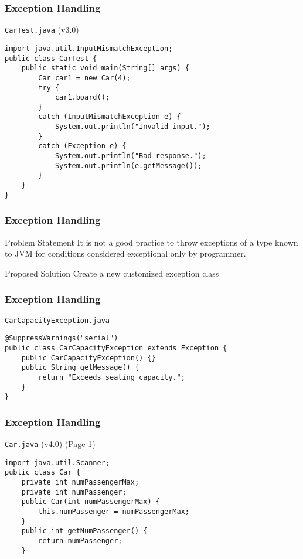 \documentclass[10pt, compress]{beamer}
\begin{document}
\begin{frame}[fragile]
	\frametitle{Exception Handling}
	\begin{block}{\texttt{CarTest.java} (v3.0)}
		\begin{verbatim}
import java.util.InputMismatchException;
public class CarTest {
	public static void main(String[] args) {
		Car car1 = new Car(4);
		try {
			car1.board();
		}
		catch (InputMismatchException e) {
			System.out.println("Invalid input.");
		}
		catch (Exception e) {
			System.out.println("Bad response.");
			System.out.println(e.getMessage());
		}
	}
}
		\end{verbatim}
	\end{block}
\end{frame}

\begin{frame}[fragile]
	\frametitle{Exception Handling}
	\begin{block}{Problem Statement}
		It is not a good practice to throw exceptions of a type known to JVM for conditions considered exceptional only by programmer.
	\end{block}
	\begin{block}{Proposed Solution}
		Create a new customized exception class
	\end{block}
\end{frame}

\begin{frame}[fragile]
	\frametitle{Exception Handling}
	\begin{block}{\texttt{CarCapacityException.java}}
		\begin{verbatim}
@SuppressWarnings("serial")
public class CarCapacityException extends Exception {
	public CarCapacityException() {}
	public String getMessage() {
		return "Exceeds seating capacity.";
	}
}
		\end{verbatim}
	\end{block}
\end{frame}

\begin{frame}[fragile]
	\frametitle{Exception Handling}
	\begin{block}{\texttt{Car.java} (v4.0) (Page 1)}
		\begin{verbatim}
import java.util.Scanner;
public class Car {
	private int numPassengerMax;
	private int numPassenger;
	public Car(int numPassengerMax) {
		this.numPassenger = numPassengerMax;
	}
	public int getNumPassenger() {
		return numPassenger;
	}
		\end{verbatim}
	\end{block}
\end{frame}
\end{document}
